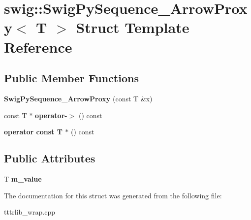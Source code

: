 \hypertarget{structswig_1_1_swig_py_sequence___arrow_proxy}{}\section{swig\+:\+:Swig\+Py\+Sequence\+\_\+\+Arrow\+Proxy$<$ T $>$ Struct Template Reference}
\label{structswig_1_1_swig_py_sequence___arrow_proxy}
\subsection*{Public Member Functions}
\begin{DoxyCompactItemize}
\item 
\mbox{\label{structswig_1_1_swig_py_sequence___arrow_proxy_a28b1117f7ac65b3ec51101215306a9d9}} 
{\bfseries Swig\+Py\+Sequence\+\_\+\+Arrow\+Proxy} (const T \&x)
\item 
\mbox{\label{structswig_1_1_swig_py_sequence___arrow_proxy_a8f9c6d4d0feb5cf17f8cb06e30f5721e}} 
const T $\ast$ {\bfseries operator-\/$>$} () const
\item 
\mbox{\label{structswig_1_1_swig_py_sequence___arrow_proxy_a6e0e0a0f3bb533b48aa05bd94165929b}} 
{\bfseries operator const T $\ast$} () const
\end{DoxyCompactItemize}
\subsection*{Public Attributes}
\begin{DoxyCompactItemize}
\item 
\mbox{\label{structswig_1_1_swig_py_sequence___arrow_proxy_a7e68416553925e7556e737325c324e0f}} 
T {\bfseries m\+\_\+value}
\end{DoxyCompactItemize}


The documentation for this struct was generated from the following file\+:\begin{DoxyCompactItemize}
\item 
tttrlib\+\_\+wrap.\+cpp\end{DoxyCompactItemize}

